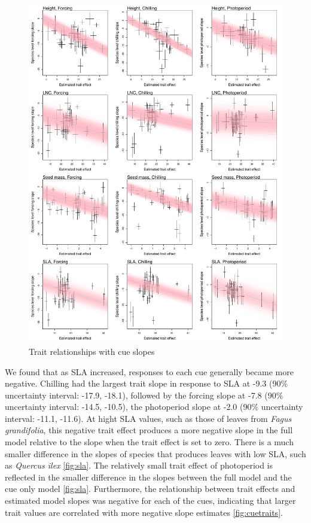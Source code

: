\documentclass{article}\usepackage[]{graphicx}\usepackage[]{color}
\begin{document}
\begin{figure}[h!]
    \centering
 \includegraphics[width=\textwidth]{..//..//analyses/traits/figures/cuetrait_wtrend.pdf} 
    \caption{Trait relationships with cue slopes}
    \label{fig:cuetraits_wtrend}
\end{figure}


We found that as SLA increased, responses to each cue generally became more negative. Chilling had the largest trait slope in response to SLA at -9.3 (90\% uncertainty interval: -17.9, -18.1), followed by the forcing slope at -7.8 (90\% uncertainty interval: -14.5, -10.5), the photoperiod slope at -2.0 (90\% uncertainty interval: -11.1, -11.6). At hight SLA values, such as those of leaves from \textit{Fagus grandifolia}, this negative trait effect produces a more negative slope in the full model relative to the slope when the trait effect is set to zero. There is a much smaller difference in the slopes of species that produces leaves with low SLA, such as \textit{Quercus ilex} \ref{fig:sla}. The relatively small trait effect of photoperiod is reflected in the smaller difference in the slopes between the full model and the cue only model \ref{fig:sla}. Furthermore, the relationship between trait effects and estimated model slopes was negative for each of the cues, indicating that larger trait values are correlated with more negative slope estimates \ref{fig:cuetraits}. 
\end{document}
